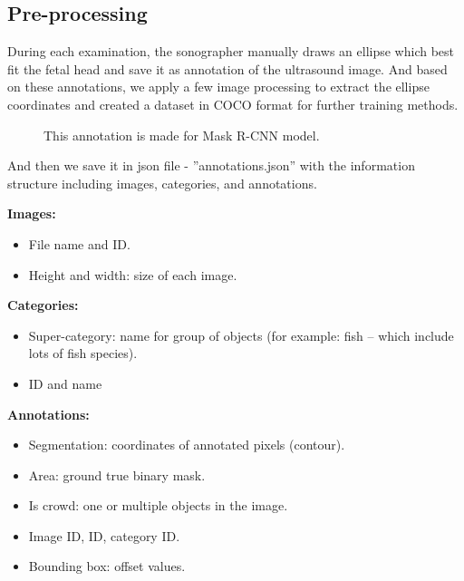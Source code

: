 	
\subsection{Pre-processing}
\noindent

	During each examination, the sonographer manually draws an ellipse which best fit the fetal head and save it as annotation of the ultrasound image. And based on these annotations, we apply a few image processing to extract the ellipse coordinates and created a dataset in COCO format for further training methods.
	
	\begin{figure}[H]
		\centering
		\caption{This annotation is made for Mask R-CNN model.}
	\end{figure}
	
	And then we save it in json file - ”annotations.json” with the information structure including images, categories, and annotations.

	\textbf{Images:}
\begin{itemize}
	\item File name and ID.
	\item Height and width: size of each image.
\end{itemize}

	\textbf{Categories:}
\begin{itemize}
	\item Super-category: name for group of objects (for example: fish – which include lots of fish species).
	\item ID and name
\end{itemize}

	\textbf{Annotations:}
\begin{itemize}
	
	\item Segmentation: coordinates of annotated pixels (contour).
	\item Area: ground true binary mask.
	\item Is crowd: one or multiple objects in the image.
	\item Image ID, ID, category ID.
	\item Bounding box: offset values.
\end{itemize}
	
